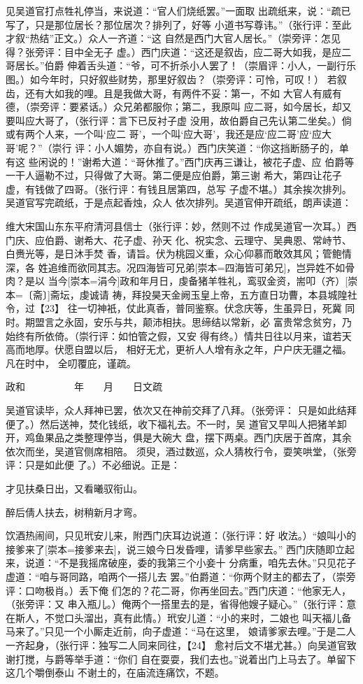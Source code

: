 \documentclass[UTF8,scheme=chinese,11pt,linespread=1.4]{ctexbook}
\makeatletter
\newcommand{\banben}[2][]{#2}
\newenvironment{diben}[1]
  {\list{}{\listparindent 2em
    \itemindent\listparindent
    \rightmargin 0em  %
    \leftmargin 0em  %
    \parsep \z@ \@plus\p@}%
   \item\relax}
  {\endlist}
\makeatother
\begin{document}
\begin{diben}
只见吴道官打点牲礼停当，来说道：“官人们烧纸罢。”一面取
出疏纸来，说：“疏已写了，只是那位居长？那位居次？排列了，好等
小道书写尊讳。”（张行评：至此才叙“热结”正文。）众人一齐道：“这
自然是西门大官人居长。”（崇旁评：怎见得？张旁评：目中全无子
虚。）西门庆道：“这还是叙齿，应二哥大如我，是应二哥居长。”伯爵
伸着舌头道：“爷，可不折杀小人罢了！（崇眉评：小人，一副行乐
图。）如今年时，只好叙些财势，那里好叙齿？（崇旁评：可怜，可叹！）
若叙齿，还有大如我的哩。且是我做大哥，有两件不妥：第一，不如
大官人有威有德，（崇旁评：要紧话。）众兄弟都服你；第二，我原叫
应二哥，如今居长，却又要叫应大哥了，（张行评：言下已反衬子虚
没用，故伯爵自己先认第二坐矣。）倘或有两个人来，一个叫‘应二
哥’，一个叫‘应大哥’，我还是应‘应二哥’应‘应大哥’呢？”（崇行
评：小人媚势，亦自有说。）西门庆笑道：“你这挡断肠子的，单有这
些闲说的！”谢希大道：“哥休推了。”西门庆再三谦让，被花子虚、应
伯爵等一干人逼勒不过，只得做了大哥。第二便是应伯爵，第三谢
希大，第四让花子虚，有钱做了四哥。（张行评：有钱且居第四，总写
子虚不堪。）其余挨次排列。吴道官写完疏纸，于是点起香烛，众人
依次排列。吴道官伸开疏纸，朗声读道：

维大宋国山东东平府清河县信士（张行评：妙，然则不过
作成吴道官一次耳。）西门庆、应伯爵、谢希大、花子虚、孙天
化、祝实念、云理守、吴典恩、常峙节、白赉光等，是日沐手焚
香，请旨。伏为桃园义重，众心仰慕而敢效其风；管鲍情深，各
姓追维而欲同其志。况\banben{四海皆可兄弟}[崇本={四海皆可弟兄}]，岂异姓不如骨肉？是以
\banben{当今}[崇本={涓今}]政和年月日，虔备猪羊牲礼，鸾驭金资，耑叩\banben{（齐）}[崇本={〔斋〕}]斋坛，虔诚请
祷，拜投昊天金阙玉皇上帝，五方直日功曹，本县城隍社令，过【23】
往一切神衹，仗此真香，普同鉴察。伏念庆等，生虽异日，死冀
同时。期盟言之永固，安乐与共，颠沛相扶。思缔结以常新，必
富贵常念贫穷，乃始终有所依倚。（崇行评：如怕管之假，又安
得有终。）情共日往以月来，谊若天高而地厚。伏愿自盟以后，
相好无尤，更祈人人增有永之年，户户庆无疆之福。凡在时中，
全叨覆庇，谨疏。

政和　　　　　年　　月　　日文疏

\noindent 吴道官读毕，众人拜神已罢，依次又在神前交拜了八拜。（张旁评：
只是如此结拜便了。）然后送神，焚化钱纸，收下福礼去。不一时，吴
道官又早叫人把猪羊卸开，鸡鱼果品之类整理停当，俱是大碗大
盘，摆下两桌。西门庆居于首席，其余依次而坐，吴道官侧席相陪。
须臾，酒过数巡，众人猜枚行令，耍笑哄堂，（张旁评：只是如此便
了。）不必细说。正是：

才见扶桑日出，又看曦驭衔山。

醉后倩人扶去，树稍新月才弯。

饮酒热闹间，只见玳安儿来，附西门庆耳边说道：（张行评：好
收法。）“娘叫小的\banben{接爹来了}[崇本={接爹来去}]，说三娘今日发昏哩，请爹早些家去。”
西门庆随即立起来，说道：“不是我摇席破座，委的我第三个小妾十
分病重，咱先去休。”只见花子虚道：“咱与哥同路，咱两个一搭儿去
罢。”伯爵道：“你两个财主的都去了，（崇旁评：口吻极肖。）丢下俺
们怎的？花二哥，你再坐回去。”西门庆道：“他家无人，（张旁评：又
串入瓶儿。）俺两个一搭里去的是，省得他嫂子疑心。”（张行评：意
在斯人，不觉口头溜出，真有此情。）玳安儿道：“小的来时，二娘也
叫天福儿备马来了。”只见一个小厮走近前，向子虚道：“马在这里，
娘请爹家去哩。”于是二人一齐起身，（张行评：独写二人同来同往，【24】
愈衬后文不堪尤甚。）向吴道官致谢打搅，与爵等举手道：“你们
自在耍耍，我们去也。”说着出门上马去了。单留下这几个嚼倒泰山
不谢土的，在庙流连痛饮，不题。


\end{diben}
\end{document}
